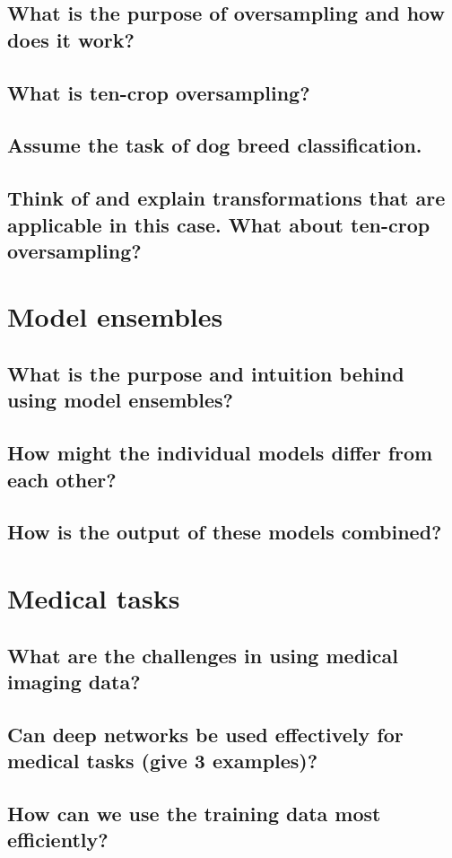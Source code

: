 \subsection{What is the purpose of oversampling and how does it work?}
\subsection{What is ten-crop oversampling?}
\subsection{Assume the task of dog breed classification.}
\subsection{Think of and explain transformations that are applicable in this case. What about ten-crop oversampling?}

\section{Model ensembles}
\subsection{What is the purpose and intuition behind using model ensembles?}
\subsection{How might the individual models differ from each other?}
\subsection{How is the output of these models combined?}

\section{Medical tasks}
\subsection{What are the challenges in using medical imaging data?}
\subsection{Can deep networks be used effectively for medical tasks (give 3 examples)?}
\subsection{How can we use the training data most efficiently?}

